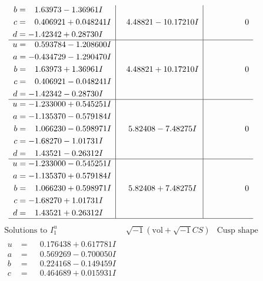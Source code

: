 \documentclass[1p]{elsarticle_modified}
\theoremstyle{definition}
\newcommand{\I}{\sqrt{-1}}
\begin{document}
$$\begin{array}{c|c|c}
\begin{aligned}
b &= \phantom{-}1.63973 - 1.36961 I \\
c &= \phantom{-}0.406921 + 0.048241 I \\
d &= -1.42342 + 0.28730 I\end{aligned}
 & \phantom{-}4.48821 - 10.17210 I & \phantom{-0.000000 } 0 \\ \hline\begin{aligned}
u &= \phantom{-}0.593784 - 1.208600 I \\
a &= -0.434729 - 1.290470 I \\
b &= \phantom{-}1.63973 + 1.36961 I \\
c &= \phantom{-}0.406921 - 0.048241 I \\
d &= -1.42342 - 0.28730 I\end{aligned}
 & \phantom{-}4.48821 + 10.17210 I & \phantom{-0.000000 } 0 \\ \hline\begin{aligned}
u &= -1.233000 + 0.545251 I \\
a &= -1.135370 - 0.579184 I \\
b &= \phantom{-}1.066230 - 0.598971 I \\
c &= -1.68270 - 1.01731 I \\
d &= \phantom{-}1.43521 - 0.26312 I\end{aligned}
 & \phantom{-}5.82408 - 7.48275 I & \phantom{-0.000000 } 0 \\ \hline\begin{aligned}
u &= -1.233000 - 0.545251 I \\
a &= -1.135370 + 0.579184 I \\
b &= \phantom{-}1.066230 + 0.598971 I \\
c &= -1.68270 + 1.01731 I \\
d &= \phantom{-}1.43521 + 0.26312 I\end{aligned}
 & \phantom{-}5.82408 + 7.48275 I & \phantom{-0.000000 } 0\\
 \hline 
 \end{array}$$\newpage$$\begin{array}{c|c|c}  
\text{Solutions to }I^u_{1}& \I (\text{vol} + \sqrt{-1}CS) & \text{Cusp shape}\\
 \hline 
\begin{aligned}
u &= \phantom{-}0.176438 + 0.617781 I \\
a &= \phantom{-}0.569269 - 0.700050 I \\
b &= \phantom{-}0.224168 - 0.149459 I \\
c &= \phantom{-}0.464689 + 0.015931 I \\

\end{aligned}
\end{array}$$
\end{document}
